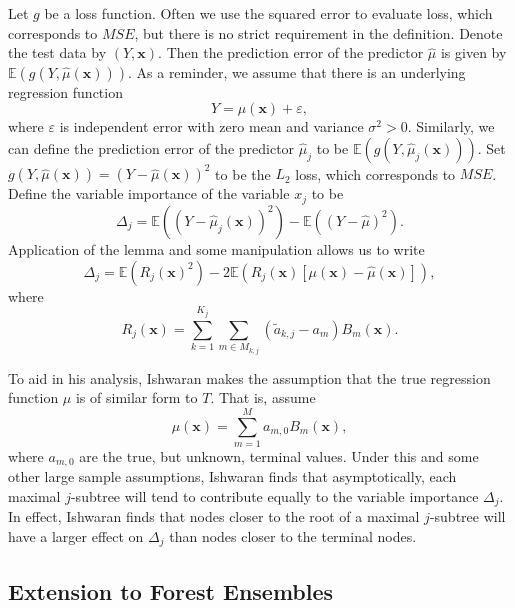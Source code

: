 \documentclass[12pt,twoside]{reedthesis}
\theoremstyle{definition}
\theoremstyle{definition}
\theoremstyle{definition}
\theoremstyle{remark}
\begin{document}
Let \(g\) be a loss function. Often we use the squared error to evaluate
loss, which corresponds to \(MSE\), but there is no strict requirement
in the definition. Denote the test data by \((Y,\mathbf{x})\). Then the
prediction error of the predictor \(\hat{\mu}\) is given by
\(\mathbb{E}(g(Y,\hat{\mu}(\mathbf{x})))\). As a reminder, we assume
that there is an underlying regression function
\[Y=\mu(\mathbf{x})+\varepsilon,\] where \(\varepsilon\) is independent
error with zero mean and variance \(\sigma^2>0\). Similarly, we can
define the prediction error of the predictor \(\hat{\mu}_j\) to be
\(\mathbb{E}(g(Y,\hat{\mu}_j(\mathbf{x}))).\) Set
\(g(Y,\hat{\mu}(\mathbf{x}))=(Y-\hat{\mu}(\mathbf{x}))^2\) to be the
\(L_2\) loss, which corresponds to \(MSE\). Define the variable
importance of the variable \(x_j\) to be
\[\Delta_j=\mathbb{E}((Y-\hat{\mu}_j(\mathbf{x}))^2)-\mathbb{E}((Y-\hat{\mu})^2).\]
Application of the lemma and some manipulation allows us to write
\[\Delta_j=\mathbb{E}(R_j(\mathbf{x})^2)-2\mathbb{E}\left(R_j(\mathbf{x})[\mu(\mathbf{x})-\hat{\mu}(\mathbf{x})]\right),\]
where
\[R_j(\mathbf{x})=\sum_{k=1}^{K_j}\sum_{m\in M_{k,j}} (\tilde{a}_{k,j} -a_m)B_m(\mathbf{x}).\]

To aid in his analysis, Ishwaran makes the assumption that the true
regression function \(\mu\) is of similar form to \(T\). That is, assume
\[\mu(\mathbf{x})=\sum_{m=1}^M a_{m,0} B_m(\mathbf{x}),\] where
\(a_{m,0}\) are the true, but unknown, terminal values. Under this and
some other large sample assumptions, Ishwaran finds that asymptotically,
each maximal \(j\)-subtree will tend to contribute equally to the
variable importance \(\Delta_j\). In effect, Ishwaran finds that nodes
closer to the root of a maximal \(j\)-subtree will have a larger effect
on \(\Delta_j\) than nodes closer to the terminal nodes.

\subsection{Extension to Forest
Ensembles}\label{extension-to-forest-ensembles}
\end{document}
